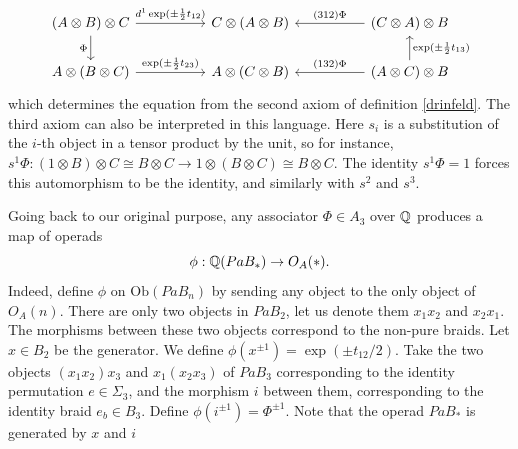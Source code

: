 \documentclass[TFM.tex]{subfiles}
\begin{document}
\[
\begin{tikzcd}[column sep=50]
(A\otimes B)\otimes C \arrow[r, "d^1\exp(\pm\frac{1}{2}t_{12})"] \arrow[d, "\Phi"'] & C\otimes (A\otimes B)   & (C\otimes A)\otimes B\arrow[l, "(312)\Phi"']  \\
A\otimes (B\otimes C) \arrow[r, "\exp(\pm\frac{1}{2}t_{23})"]                                    & A\otimes (C\otimes B) & (A\otimes C)\otimes B\arrow[l, "(132)\Phi"']\arrow[u, "\exp(\pm\frac{1}{2}t_{13})"']                         
\end{tikzcd}
\]
which determines the equation from the second axiom of definition \ref{drinfeld}. The third axiom can also be interpreted in this language. Here $s_i$ is a substitution of the $i$-th object in a tensor product by the unit, so for instance, $s^1\Phi:(1\otimes B)\otimes C\cong B\otimes C\to 1\otimes (B\otimes C)\cong B\otimes C$. The identity $s^1\Phi=1$ forces this automorphism to be the identity, and similarly with $s^2$ and $s^3$. 

Going back to our original purpose, any associator $\Phi\in A_3$ over $\mathbb{Q}$ produces a map of operads
\[
\phi:\mathbb{Q}(PaB_*)\to O_A(*).
\]
Indeed, define $\phi$ on $\mathrm{Ob}(PaB_n)$ by sending any object to the only object of $O_A(n)$.
There are only two objects in $PaB_2$, let us denote them $x_1x_2$ and $x_2x_1$. The morphisms
between these two objects correspond to the non-pure braids. Let $x\in B_2$
be the generator. We define $\phi(x^{\pm 1})=\exp(\pm t_{12}/2)$. Take the two objects $(x_1x_2)x_3$ and
$x_1(x_2x_3)$ of $PaB_3$ corresponding to the identity permutation $e \in \Sigma_3$, and the morphism
$i$ between them, corresponding to the identity braid $e_b\in B_3$. Define $\phi(i^{\pm 1})=\Phi^{\pm 1}$.
Note that the operad $PaB_*$ is generated by $x$ and $i$ %
%
%
%
%
\end{document}
